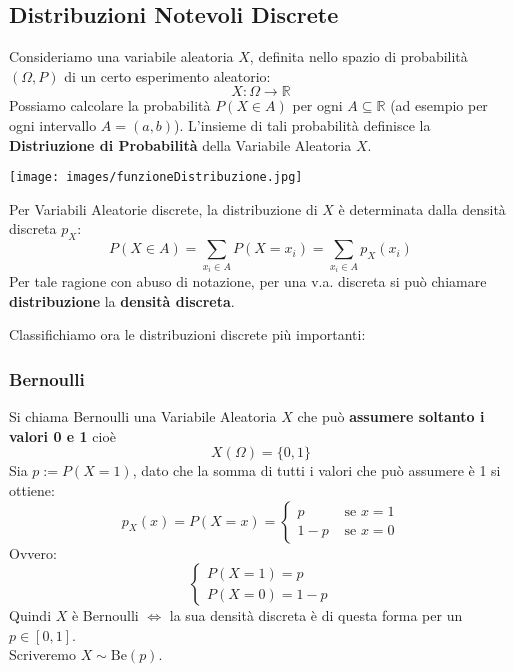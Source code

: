 

	\subsection{Distribuzioni Notevoli Discrete}
	Consideriamo una variabile aleatoria $X$, definita nello spazio di probabilità
$(\Omega, P)$ di un certo esperimento aleatorio:
	\[
		X:\Omega \rightarrow \mathbb{R}
	\]
	Possiamo calcolare la probabilità $P(X \in A)$ per ogni $A \subseteq \mathbb{R}$
	(ad esempio per ogni intervallo $A=(a,b)$).
	L'insieme di tali probabilità definisce la \textbf{Distriuzione di Probabilità} della Variabile Aleatoria $X$.
	\begin{center}
		\texttt{[image: images/funzioneDistribuzione.jpg]}
	\end{center}

	Per Variabili Aleatorie discrete, la distribuzione di $X$ è determinata dalla densità discreta $p_X$:
	\[
		P(X \in A) = \sum_{x_i \in A} P(X=x_i) = \sum_{x_i \in A} p_X(x_i)
	\]
	Per tale ragione con abuso di notazione, per una v.a. discreta si può chiamare
	\textbf{distribuzione} la \textbf{densità discreta}.

	Classifichiamo ora le distribuzioni discrete più importanti:

	\subsubsection{Bernoulli}
	Si chiama Bernoulli una Variabile Aleatoria $X$ che può \textbf{assumere soltanto i valori 0 e 1} cioè
	\[
		X(\Omega) = \{0,1\}
	\]
	Sia $p:=P(X=1)$, dato che la somma di tutti i valori che può assumere è 1 si ottiene:
	\[
		p_X (x) = P(X=x) =
		\begin{cases}
			p   & \text{ se } x=1 \\
			1-p & \text{ se } x=0
		\end{cases}
	\]
	Ovvero:
	\[
		\begin{cases}
			P(X=1) = p \\
			P(X=0)= 1-p
		\end{cases}
	\]
	Quindi $X$ è Bernoulli $\Leftrightarrow$ la sua densità discreta è di questa
	forma per un $p \in [0,1]$.
	\\ Scriveremo $X \sim \text{Be}(p)$.

